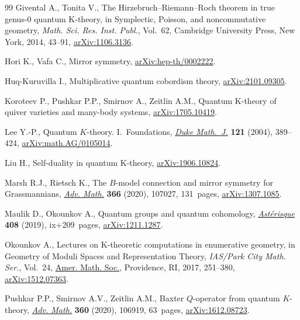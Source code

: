 \begin{thebibliography}{99}
Givental A., Tonita V., The {H}irzebruch--{R}iemann--{R}och theorem in true
 genus-0 quantum {K}-theory, in Symplectic, {P}oisson, and noncommutative
 geometry, \textit{Math. Sci. Res. Inst. Publ.}, Vol.~62, Cambridge University
 Press, New York, 2014, 43--91, \href{https://arxiv.org/abs/1106.3136}{arXiv:1106.3136}.

Hori K., Vafa C., Mirror symmetry, \href{https://arxiv.org/abs/hep-th/0002222}{arXiv:hep-th/0002222}.

Huq-Kuruvilla I., Multiplicative quantum cobordism theory, \href{https://arxiv.org/abs/2101.09305}{arXiv:2101.09305}.

Koroteev P., Pushkar P.P., Smirnov A., Zeitlin A.M., Quantum {K}-theory of
 quiver varieties and many-body systems, \href{https://arxiv.org/abs/1705.10419}{arXiv:1705.10419}.

Lee Y.-P., Quantum {$K$}-theory. {I}.~{F}oundations, \href{https://doi.org/10.1215/S0012-7094-04-12131-1}{\textit{Duke Math.~J.}}
 \textbf{121} (2004), 389--424, \href{https://arxiv.org/abs/math.AG/0105014}{arXiv:math.AG/0105014}.

Liu H., Self-duality in quantum {K}-theory, \href{https://arxiv.org/abs/1906.10824}{arXiv:1906.10824}.

Marsh R.J., Rietsch K., The {$B$}-model connection and mirror symmetry for
 {G}rassmannians, \href{https://doi.org/10.1016/j.aim.2020.107027}{\textit{Adv. Math.}} \textbf{366} (2020), 107027, 131~pages,
 \href{https://arxiv.org/abs/1307.1085}{arXiv:1307.1085}.

Maulik D., Okounkov A., Quantum groups and quantum cohomology,
 \href{https://doi.org/10.24033/ast}{\textit{Ast\'erisque}} \textbf{408} (2019), ix+209~pages, \href{https://arxiv.org/abs/1211.1287}{arXiv:1211.1287}.

Okounkov A., Lectures on {K}-theoretic computations in enumerative geometry, in
 Geometry of Moduli Spaces and Representation Theory, \textit{IAS/Park City
 Math. Ser.}, Vol.~24, \href{https://doi.org/10.1090/pcms/024}{Amer. Math. Soc.}, Providence, RI, 2017, 251--380,
 \href{https://arxiv.org/abs/1512.07363}{arXiv:1512.07363}.

Pushkar P.P., Smirnov A.V., Zeitlin A.M., Baxter {$Q$}-operator from quantum
 {$K$}-theory, \href{https://doi.org/10.1016/j.aim.2019.106919}{\textit{Adv. Math.}} \textbf{360} (2020), 106919, 63~pages,
 \href{https://arxiv.org/abs/1612.08723}{arXiv:1612.08723}.


\end{thebibliography}
